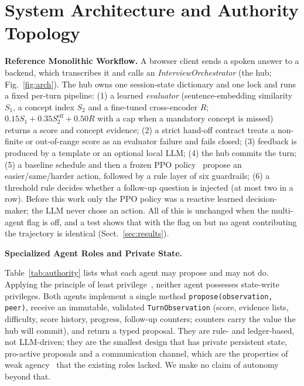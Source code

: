 \section{System Architecture and Authority Topology}\label{sec:design}
\noindent\textbf{Reference Monolithic Workflow.}
A browser client sends a spoken answer to a backend, which transcribes it and calls an \emph{InterviewOrchestrator} (the hub; Fig.~\ref{fig:arch}). The hub owns one session-state dictionary and one lock and runs a fixed per-turn pipeline: (1) a learned \emph{evaluator} (sentence-embedding similarity $S_1$, a concept index $S_2$ and a fine-tuned cross-encoder $R$; $0.15S_1{+}0.35S_2^{\mathrm{eff}}{+}0.50R$ with a cap when a mandatory concept is missed) returns a score and concept evidence; (2) a strict hand-off contract treats a non-finite or out-of-range score as an evaluator failure and fails closed; (3) feedback is produced by a template or an optional local LLM; (4) the hub commits the turn; (5) a baseline schedule and then a frozen PPO policy~\cite{sb3,ppo} propose an easier/same/harder action, followed by a rule layer of six guardrails; (6) a threshold rule decides whether a follow-up question is injected (at most two in a row). Before this work only the PPO policy was a reactive learned decision-maker; the LLM never chose an action. All of this is unchanged when the multi-agent flag is off, and a test shows that with the flag on but no agent contributing the trajectory is identical (Sect.~\ref{sec:results}).

\noindent\textbf{Specialized Agent Roles and Private State.}
\begin{table}[tbp]
\centering\small
\caption{Authority matrix, generated from the enforcing code (\texttt{agents/multiagent/} \texttt{authority.py}). Neither agent has state-write authority; the hub commits alone.}\label{tab:authority}

\end{table}
Table~\ref{tab:authority} lists what each agent may propose and may not do. Applying the principle of least privilege~\cite{ss75}, neither agent possesses state-write privileges. Both agents implement a single method \texttt{propose(observation, peer)}, receive an immutable, validated \texttt{TurnObservation} (score, evidence lists, difficulty, score history, progress, follow-up counters; counters carry the value the hub will commit), and return a typed proposal. They are rule- and ledger-based, not LLM-driven; they are the smallest design that has private persistent state, pro-active proposals and a communication channel, which are the properties of weak agency~\cite{wj95} that the existing roles lacked. We make no claim of autonomy beyond that.

